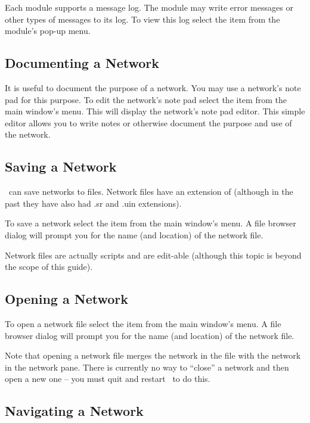 Each module supports a message log.  The module may write error messages or
other types of messages to its log.  To view this log select the
 item from the module's pop-up menu.

\subsection{Documenting a Network}
\label{sec:docnetwork}

It is useful to document the purpose of a network.  You may use a network's
note pad for this purpose.  To edit the network's note pad select the
 item from the main window's  menu.  This
will display the network's note pad editor.  This simple editor allows you
to write notes or otherwise document the purpose and use of the network.


\subsection{Saving a Network}
\label{sec:savenet}

\sr\ can save networks to files.  Network files have an extension of
 (although in the past they have also had .sr and .uin
extensions).  

To save a network select the  item from the main window's
 menu.  A file browser dialog will prompt you for the
name (and location) of the network file.

Network files are actually  scripts and
are edit-able (although this topic is beyond the scope of this guide).

\subsection{Opening a Network}
\label{sec:opennet}

To open a network file select the  item from the main
window's  menu.   A file browser dialog will prompt you for the
name (and location) of the network file.

Note that opening a network file merges the network in the file with the
network in the network pane.  There is currently no way to ``close'' a
network and then open a new one -- you must quit and restart \sr\ to do
this.

\subsection{Navigating a Network}
\label{sec:navnetwork}

